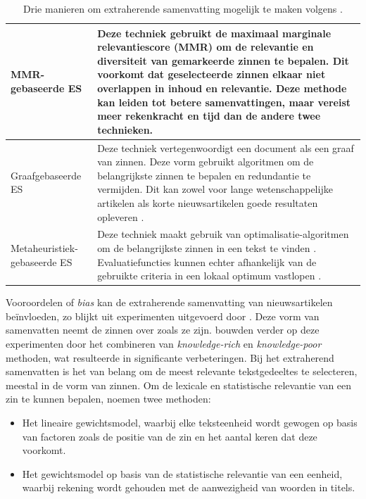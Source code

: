 \begin{center}
	\begin{table}[H]
	\begin{tabular}{ | m{4cm} | m{12cm} | } 
		\hline
		MMR-gebaseerde ES & Deze techniek gebruikt de maximaal marginale relevantiescore (MMR) om de relevantie en diversiteit van gemarkeerde zinnen te bepalen. Dit voorkomt dat geselecteerde zinnen elkaar niet overlappen in inhoud en relevantie. Deze methode kan leiden tot betere samenvattingen, maar vereist meer rekenkracht en tijd dan de andere twee technieken. \\
		\hline
		Graafgebaseerde ES & Deze techniek vertegenwoordigt een document als een graaf van zinnen. Deze vorm gebruikt algoritmen om de belangrijkste zinnen te bepalen en redundantie te vermijden. Dit kan zowel voor lange wetenschappelijke artikelen als korte nieuwsartikelen goede resultaten opleveren \autocite{McDonald2007, Lin2010}. \\ 
		\hline
		Metaheuristiek-gebaseerde ES & Deze techniek maakt gebruik van optimalisatie-algoritmen om de belangrijkste zinnen in een tekst te vinden \autocite{Premjith2015, Verma2020}. Evaluatiefuncties kunnen echter afhankelijk van de gebruikte criteria in een lokaal optimum vastlopen \autocite{Rani2021}. \\
		\hline
	\end{tabular}
	\caption{Drie manieren om extraherende samenvatting mogelijk te maken volgens \textcite{Verma2020}.}
	\label{table:extractive-summarization}
	\end{table}
\end{center}

Vooroordelen of \textit{bias} kan de extraherende samenvatting van nieuwsartikelen beïnvloeden, zo blijkt uit experimenten uitgevoerd door \textcite{McKeown1999}. Deze vorm van samenvatten neemt de zinnen over zoals ze zijn. \textcite{Hahn2000} bouwden verder op deze experimenten door het combineren van \textit{knowledge-rich} en \textit{knowledge-poor} methoden, wat resulteerde in significante verbeteringen. Bij het extraherend samenvatten is het van belang om de meest relevante tekstgedeeltes te selecteren, meestal in de vorm van zinnen. Om de lexicale en statistische relevantie van een zin te kunnen bepalen, noemen \textcite{Hahn2000} twee methoden:

\begin{itemize}
	\item Het lineaire gewichtsmodel, waarbij elke teksteenheid wordt gewogen op basis van factoren zoals de positie van de zin en het aantal keren dat deze voorkomt.
	\item Het gewichtsmodel op basis van de statistische relevantie van een eenheid, waarbij rekening wordt gehouden met de aanwezigheid van woorden in titels.
\end{itemize}

